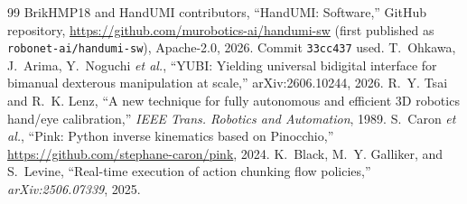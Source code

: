 \documentclass[conference,10pt]{IEEEtran}
\begin{document}
\begin{thebibliography}{99}
 BrikHMP18 and HandUMI contributors, ``HandUMI: Software,'' GitHub repository, \url{https://github.com/murobotics-ai/handumi-sw} (first published as \texttt{robonet-ai/handumi-sw}), Apache-2.0, 2026. Commit \texttt{33cc437} used.
 T.~Ohkawa, J.~Arima, Y.~Noguchi \emph{et al.}, ``YUBI: Yielding universal bidigital interface for bimanual dexterous manipulation at scale,'' arXiv:2606.10244, 2026.
 R.~Y. Tsai and R.~K. Lenz, ``A new technique for fully autonomous and efficient 3D robotics hand/eye calibration,'' \emph{IEEE Trans. Robotics and Automation}, 1989.
 S.~Caron \emph{et al.}, ``Pink: Python inverse kinematics based on Pinocchio,'' \url{https://github.com/stephane-caron/pink}, 2024.
 K.~Black, M.~Y. Galliker, and S.~Levine, ``Real-time execution of action chunking flow policies,'' \emph{arXiv:2506.07339}, 2025.
\end{thebibliography}
\end{document}
